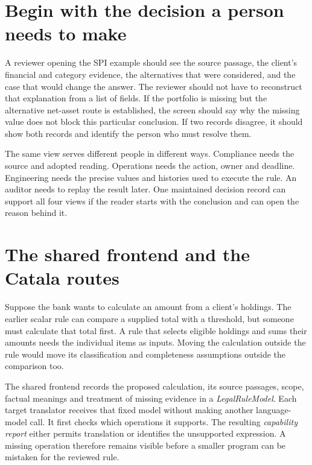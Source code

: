 \documentclass[12pt,a4paper,oneside,openany]{book}
\begin{document}
\section{Begin with the decision a person needs to make}

A reviewer opening the SPI example should see the source passage, the client's
financial and category evidence, the alternatives that were considered, and the
case that would change the answer. The reviewer should not have to reconstruct
that explanation from a list of fields. If the portfolio is missing but the
alternative net-asset route is established, the screen should say why the missing
value does not block this particular conclusion. If two records disagree, it
should show both records and identify the person who must resolve them.

The same view serves different people in different ways. Compliance needs the
source and adopted reading. Operations needs the action, owner and deadline.
Engineering needs the precise values and histories used to execute the rule. An
auditor needs to replay the result later. One maintained decision record can
support all four views if the reader starts with the conclusion and can open the
reason behind it.

\section{The shared frontend and the Catala routes}
\label{sec:implementation-shared-front-end}

Suppose the bank wants to calculate an amount from a client's holdings. The
earlier scalar rule can compare a supplied total with a threshold, but someone
must calculate that total first. A rule that selects eligible holdings and sums
their amounts needs the individual items as inputs. Moving the calculation
outside the rule would move its classification and completeness assumptions
outside the comparison too.

The shared frontend records the proposed calculation, its source passages,
scope, factual meanings and treatment of missing evidence in a
\emph{LegalRuleModel}. Each target translator receives that fixed model without
making another language-model call. It first checks which operations it
supports. The resulting \emph{capability report} either permits translation or
identifies the unsupported expression. A missing operation therefore remains
visible before a smaller program can be mistaken for the reviewed rule.
\end{document}
